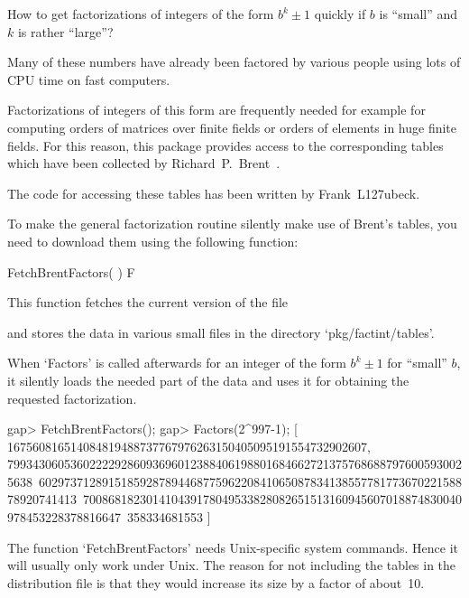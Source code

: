 

How to get factorizations of integers of the form $b^k \pm 1$ quickly
if $b$ is ``small'' and $k$ is rather ``large''?

Many of these numbers have already been factored by various people
using lots of CPU time on fast computers.

Factorizations of integers of this form are frequently needed for
example for computing orders of matrices over finite fields or orders of
elements in huge finite fields. For this reason, this package provides
access to the corresponding tables which have been collected by
Richard~P.~Brent~\cite{Brent04}.

The code for accessing these tables has been written by Frank~L\accent127ubeck.

To make the general factorization routine silently make use of Brent's
tables, you need to download them using the following function:

\>FetchBrentFactors( ) F

This function fetches the current version of the file


and stores the data in various small files in the directory `pkg/factint/tables'.

When `Factors' is called afterwards for an integer of the form
$b^k \pm 1$ for ``small'' $b$, it silently loads the needed part of
the data and uses it for obtaining the requested factorization.

\beginexample
gap> FetchBrentFactors();
gap> Factors(2^997-1);
[ 167560816514084819488737767976263150405095191554732902607,
  7993430605360222292860936960123884061988016846627213757686887976005930025638\
602973712891518592878944687759622084106508783413855778177367022158878920741413\
700868182301410439178049533828082651513160945607018874830040978453228378816647\
358334681553 ]
\endexample

The function `FetchBrentFactors' needs Unix-specific system commands.
Hence it will usually only work under Unix. The reason for not including
the tables in the distribution file is that they would increase its size
by a factor of about~10.

